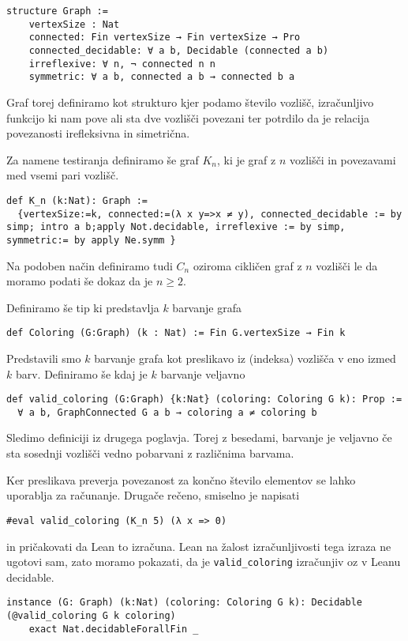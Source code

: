 \documentclass[mat1]{fmfdelo}
\begin{document}
\begin{lstlisting}
structure Graph :=
    vertexSize : Nat
    connected: Fin vertexSize → Fin vertexSize → Pro
    connected_decidable: ∀ a b, Decidable (connected a b)
    irreflexive: ∀ n, ¬ connected n n
    symmetric: ∀ a b, connected a b → connected b a
\end{lstlisting}
Graf torej definiramo kot strukturo kjer podamo število vozlišč, izračunljivo funkcijo ki nam pove
ali sta dve vozlišči povezani ter potrdilo da je relacija povezanosti irefleksivna in simetrična.

Za namene testiranja definiramo še graf $K_n$, ki je graf z $n$ vozlišči in povezavami med vsemi pari vozlišč.
\begin{lstlisting}
def K_n (k:Nat): Graph :=
  {vertexSize:=k, connected:=(λ x y=>x ≠ y), connected_decidable := by simp; intro a b;apply Not.decidable, irreflexive := by simp, symmetric:= by apply Ne.symm }
\end{lstlisting}
Na podoben način definiramo tudi $C_n$ oziroma cikličen graf z $n$ vozlišči le da moramo podati še dokaz da je $n\ge2$.

Definiramo še tip ki predstavlja $k$ barvanje grafa
\begin{lstlisting}
def Coloring (G:Graph) (k : Nat) := Fin G.vertexSize → Fin k
\end{lstlisting}

Predstavili smo $k$ barvanje grafa kot preslikavo iz (indeksa) vozlišča v eno izmed $k$ barv.
Definiramo še kdaj je $k$ barvanje veljavno
\begin{lstlisting}
def valid_coloring (G:Graph) {k:Nat} (coloring: Coloring G k): Prop :=
  ∀ a b, GraphConnected G a b → coloring a ≠ coloring b
\end{lstlisting}
Sledimo definiciji iz drugega poglavja. Torej z besedami, barvanje je veljavno 
če sta sosednji vozlišči vedno pobarvani z različnima barvama.

Ker preslikava preverja povezanost za končno število elementov se lahko uporablja za računanje. Drugače rečeno, smiselno
je napisati
\begin{lstlisting}
#eval valid_coloring (K_n 5) (λ x => 0)
\end{lstlisting}
in pričakovati da Lean to izračuna. Lean na žalost izračunljivosti tega izraza ne ugotovi sam, zato moramo pokazati, 
da je \lstinline{valid_coloring} izračunjiv oz v Leanu decidable.
\begin{lstlisting}
instance (G: Graph) (k:Nat) (coloring: Coloring G k): Decidable (@valid_coloring G k coloring)
    exact Nat.decidableForallFin _
\end{lstlisting}
\end{document}
